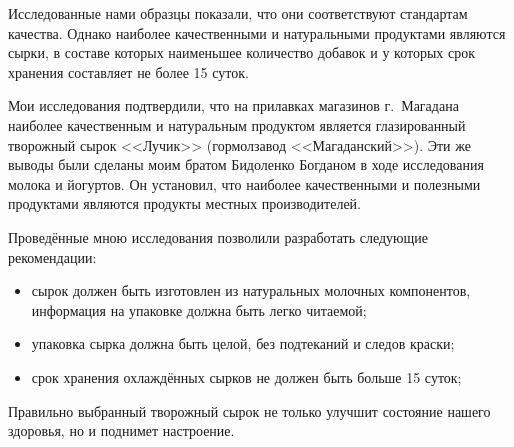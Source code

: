 Исследованные нами образцы показали, что они соответствуют стандартам качества. Однако наиболее качественными и натуральными продуктами являются сырки, в составе которых наименьшее количество добавок и у которых срок хранения составляет не более 15 суток.

Мои исследования подтвердили, что на прилавках магазинов г.~Магадана наиболее качественным и натуральным продуктом является глазированный творожный сырок <<Лучик>> (гормолзавод <<Магаданский>>). Эти же выводы были сделаны моим братом Бидоленко Богданом в ходе исследования молока и йогуртов. Он установил, что наиболее качественными и полезными продуктами являются продукты местных производителей.

Проведённые мною исследования позволили разработать следующие рекомендации:
\begin{itemize}[noitemsep]\vspace{-8pt}
\item сырок должен быть изготовлен из натуральных молочных компонентов, информация на упаковке должна быть легко читаемой;
\item упаковка сырка должна быть целой, без подтеканий и следов краски;
\item срок хранения охлаждённых сырков не должен быть больше 15 суток;
\end{itemize}\vspace{-8pt}

Правильно выбранный творожный сырок не только улучшит состояние нашего здоровья, но и поднимет настроение.
